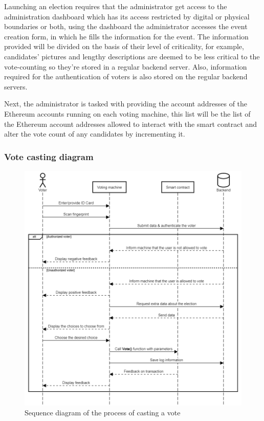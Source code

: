 Launching an election requires that the administrator get access to the administration dashboard which has its access restricted by digital or physical boundaries or both, using the dashboard the administrator accesses the event creation form, in which he fills the information for the event. The information provided will be divided on the basis of their level of criticality, for example, candidates' pictures and lengthy descriptions are deemed to be less critical to the vote-counting so they're stored in a regular backend server. Also, information required for the authentication of voters is also stored on the regular backend servers.

Next, the administrator is tasked with providing the account addresses of the Ethereum accounts running on each voting machine, this list will be the list of the Ethereum account addresses allowed to interact with the smart contract and alter the vote count of any candidates by incrementing it.

\subsubsection{Vote casting diagram}

\begin{figure}[H]
	\centering
		\includegraphics[width=14cm]{images/chapter3/voter_sequence_diagram.png}
		\caption{{\footnotesize Sequence diagram of the process of casting a vote}}
\end{figure}


